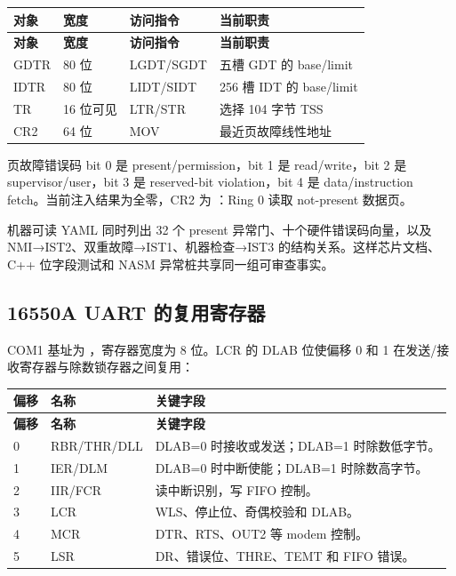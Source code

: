 \begin{longtable}{L{0.10\textwidth}L{0.18\textwidth}L{0.22\textwidth}L{0.34\textwidth}}
\toprule
\textbf{对象} & \textbf{宽度} & \textbf{访问指令} & \textbf{当前职责}\\
\midrule
\endfirsthead
\toprule
\textbf{对象} & \textbf{宽度} & \textbf{访问指令} & \textbf{当前职责}\\
\midrule
\endhead
GDTR & 80 位 & LGDT/SGDT & 五槽 GDT 的 base/limit\\
IDTR & 80 位 & LIDT/SIDT & 256 槽 IDT 的 base/limit\\
TR & 16 位可见 & LTR/STR & 选择 104 字节 TSS\\
CR2 & 64 位 & MOV & 最近页故障线性地址\\
\bottomrule
\end{longtable}

页故障错误码 bit 0 是 present/permission，bit 1 是 read/write，bit 2 是
supervisor/user，bit 3 是 reserved-bit violation，bit 4 是
data/instruction fetch。当前注入结果为全零，CR2 为
：Ring 0 读取 not-present 数据页。

机器可读 YAML 同时列出 32 个 present 异常门、十个硬件错误码向量，以及
NMI→IST2、双重故障→IST1、机器检查→IST3 的结构关系。这样芯片文档、C++
位字段测试和 NASM 异常桩共享同一组可审查事实。

\subsection{16550A UART 的复用寄存器}

COM1 基址为 ，寄存器宽度为 8 位。LCR 的 DLAB 位使偏移 0 和 1
在发送/接收寄存器与除数锁存器之间复用：

\begin{longtable}{L{0.12\textwidth}L{0.30\textwidth}L{0.38\textwidth}}
\toprule
\textbf{偏移} & \textbf{名称} & \textbf{关键字段}\\
\midrule
\endfirsthead
\toprule
\textbf{偏移} & \textbf{名称} & \textbf{关键字段}\\
\midrule
{} & RBR/THR/DLL & DLAB=0 时接收或发送；DLAB=1 时除数低字节。\\
1 & IER/DLM & DLAB=0 时中断使能；DLAB=1 时除数高字节。\\
2 & IIR/FCR & 读中断识别，写 FIFO 控制。\\
3 & LCR & WLS、停止位、奇偶校验和 DLAB。\\
4 & MCR & DTR、RTS、OUT2 等 modem 控制。\\
5 & LSR & DR、错误位、THRE、TEMT 和 FIFO 错误。\\
\bottomrule
\end{longtable}

